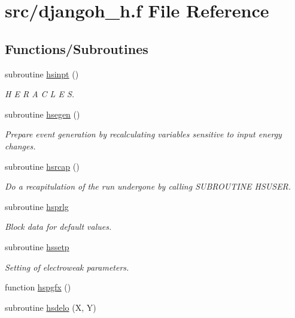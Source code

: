 \hypertarget{djangoh__h_8f}{}\section{src/djangoh\+\_\+h.f File Reference}
\label{djangoh__h_8f}
\subsection*{Functions/\+Subroutines}
\begin{DoxyCompactItemize}
\item 
subroutine \hyperlink{djangoh__h_8f_aeed46fd210a75e927cb5503e28be7285}{hsinpt} ()
\begin{DoxyCompactList}\small\item\em H E R A C L E S. \end{DoxyCompactList}\item 
subroutine \hyperlink{djangoh__h_8f_a2052ebc990554aca26866de7caeaf317}{hsegen} ()
\begin{DoxyCompactList}\small\item\em Prepare event generation by recalculating variables sensitive to input energy changes. \end{DoxyCompactList}\item 
subroutine \hyperlink{djangoh__h_8f_abe1abf958c5349e95cfe15f2fa2e3028}{hsrcap} ()
\begin{DoxyCompactList}\small\item\em Do a recapitulation of the run undergone by calling S\+U\+B\+R\+O\+U\+T\+I\+NE H\+S\+U\+S\+ER. \end{DoxyCompactList}\item 
subroutine \hyperlink{djangoh__h_8f_ae64899b0086d84846f527740cfcea200}{hsprlg}
\begin{DoxyCompactList}\small\item\em Block data for default values. \end{DoxyCompactList}\item 
subroutine \hyperlink{djangoh__h_8f_a478ee949c7cec470871f14198ba84b60}{hssetp}
\begin{DoxyCompactList}\small\item\em Setting of electroweak parameters. \end{DoxyCompactList}\item 
function \hyperlink{djangoh__h_8f_ae4f7d7eafc157933f20c44984bdac615}{hspgfx} ()
\item 
subroutine \hyperlink{djangoh__h_8f_a13f8e2a9bca26ea6b144d7f7c2c77683}{hsdelo} (X, Y)

\end{DoxyCompactItemize}
